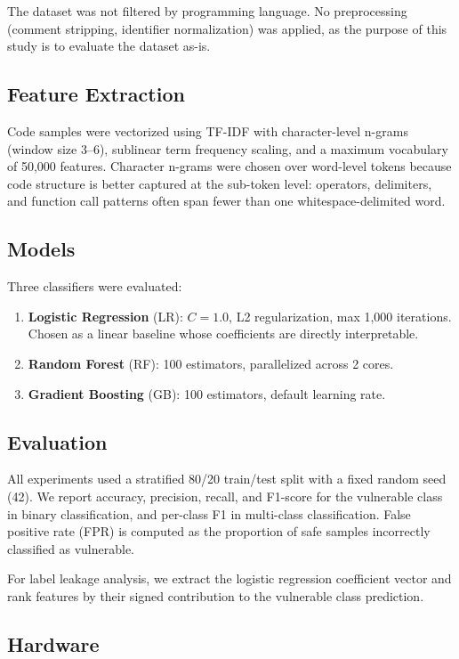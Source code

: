 \documentclass[11pt,a4paper]{article}
\begin{document}
The dataset was not filtered by programming language. No preprocessing (comment stripping, identifier normalization) was applied, as the purpose of this study is to evaluate the dataset as-is.

\subsection{Feature Extraction}

Code samples were vectorized using TF-IDF with character-level n-grams (window size 3--6), sublinear term frequency scaling, and a maximum vocabulary of 50,000 features. Character n-grams were chosen over word-level tokens because code structure is better captured at the sub-token level: operators, delimiters, and function call patterns often span fewer than one whitespace-delimited word.

\subsection{Models}

Three classifiers were evaluated:
\begin{enumerate}
    \item \textbf{Logistic Regression} (LR): $C=1.0$, L2 regularization, max 1,000 iterations. Chosen as a linear baseline whose coefficients are directly interpretable.
    \item \textbf{Random Forest} (RF): 100 estimators, parallelized across 2 cores.
    \item \textbf{Gradient Boosting} (GB): 100 estimators, default learning rate.
\end{enumerate}

\subsection{Evaluation}

All experiments used a stratified 80/20 train/test split with a fixed random seed (42). We report accuracy, precision, recall, and F1-score for the vulnerable class in binary classification, and per-class F1 in multi-class classification. False positive rate (FPR) is computed as the proportion of safe samples incorrectly classified as vulnerable.

For label leakage analysis, we extract the logistic regression coefficient vector and rank features by their signed contribution to the vulnerable class prediction.

\subsection{Hardware}
\end{document}
